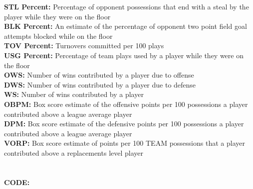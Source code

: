 \documentclass[11pt,letterpaper]{amsart}
\begin{document}
\textbf{STL Percent:} Percentage of opponent possessions that end with a steal by the player while they were on the floor\\
\textbf{BLK Percent:} An estimate of the percentage of opponent two point field goal attempts blocked while on the floor\\
\textbf{TOV Percent:} Turnovers committed per 100 plays\\
\textbf{USG Percent:} Percentage of team plays used by a player while they were on the floor\\
\textbf{OWS:} Number of wins contributed by a player due to offense\\
\textbf{DWS:} Number of wins contributed by a player due to defense\\
\textbf{WS:} Number of wins contributed by a player\\
\textbf{OBPM:} Box score estimate of the offensive points per 100 possessions a player contributed above a league average player\\
\textbf{DPM:} Box score estimate of the defensive points per 100 possessions a player contributed above a league average player\\
\textbf{VORP:} Box score estimate of points per 100 TEAM possessions that a player contributed above a replacements level player\\
\cite{6} \leavevmode \newline\\\\
\newpage
\textbf{CODE:}\\
\end{document}
